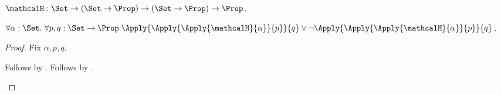 \begin{signature}\label{typed_case_predicate}
    $\mathcalH : \Set\to(\Set\to\Prop)\to(\Set\to\Prop)\to\Prop$.
\end{signature}

\begin{proposition}\label{typed_case_analysis}
    $\forall \alpha:\Set.\ \forall p,q:\Set\to\Prop.
        \Apply{\Apply{\Apply{\mathcalH}{\alpha}}{p}}{q}\lor
        \lnot\Apply{\Apply{\Apply{\mathcalH}{\alpha}}{p}}{q}$.
\end{proposition}
\begin{proof}
    Fix $\alpha,p,q$.
    \begin{byCase}
        Follows by \auto.
        Follows by \auto.
    \end{byCase}
\end{proof}
